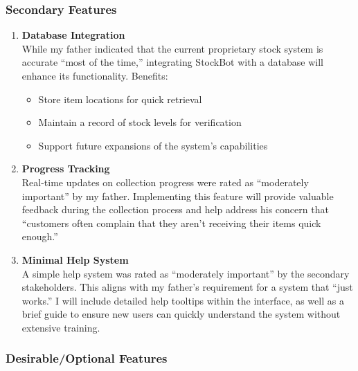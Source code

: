 \newpage

\subsubsection{Secondary Features}

\begin{enumerate}
    \item \textbf{Database Integration}\\
    While my father indicated that the current proprietary stock system is accurate ``most of the time,'' integrating StockBot with a database will enhance its functionality. Benefits:
    \begin{itemize}
        \item Store item locations for quick retrieval
        \item Maintain a record of stock levels for verification
        \item Support future expansions of the system's capabilities
    \end{itemize}
    
    \item \textbf{Progress Tracking}\\
    Real-time updates on collection progress were rated as ``moderately important'' by my father. Implementing this feature will provide valuable feedback during the collection process and help address his concern that ``customers often complain that they aren't receiving their items quick enough.''
    
    \item \textbf{Minimal Help System}\\
    A simple help system was rated as ``moderately important'' by the secondary stakeholders. This aligns with my father's requirement for a system that ``just works.'' I will include detailed help tooltips within the interface, as well as a brief guide to ensure new users can quickly understand the system without extensive training.
\end{enumerate}

\subsubsection{Desirable/Optional Features}

